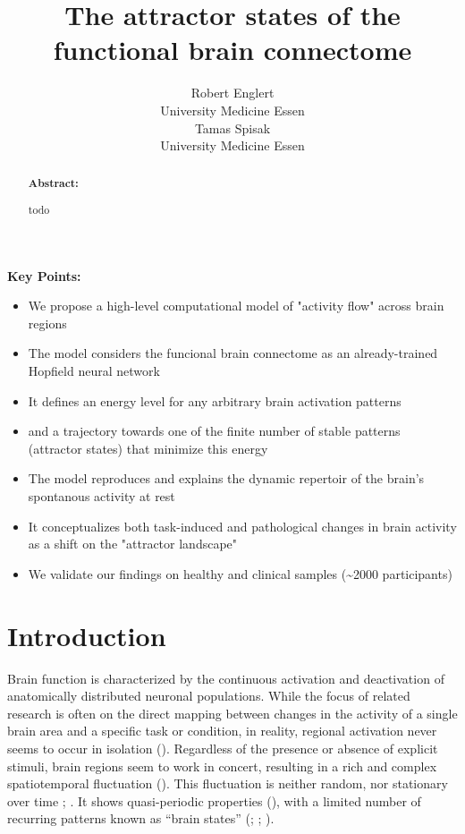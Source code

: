 \documentclass{article}
\title{The attractor states of the functional brain connectome}
\date{\displaydate{articleDate}}
\author{Robert Englert\\
University Medicine Essen\\\AND
Tamas Spisak\footnotemark[1]\\
University Medicine Essen\\}
\begin{document}
\maketitle
{}

\begin{abstract}
\textbf{Abstract:}

todo
\end{abstract}

\keywords{}

\textbf{Key Points:}

\begin{itemize}
\item We propose a high-level computational model of "activity flow" across brain regions
\item The model considers the funcional brain connectome as an already-trained Hopfield neural network
\item It defines an energy level for any arbitrary brain activation patterns
\item and a trajectory towards one of the finite number of stable patterns (attractor states) that minimize this energy
\item The model reproduces and explains the dynamic repertoir of the brain's spontanous activity at rest
\item It conceptualizes both task-induced and pathological changes in brain activity as a shift on the "attractor landscape"
\item We validate our findings on healthy and clinical samples ({\textasciitilde}2000 participants)
\end{itemize}

\section{Introduction}\label{Introduction}

Brain function is characterized by the continuous activation and deactivation of anatomically distributed neuronal populations.
While the focus of related research is often on the direct mapping between changes in the activity of a single brain area and a specific task or condition, in reality, regional activation never seems to occur in isolation (\cite{Bassett_2017}).
Regardless of the presence or absence of explicit stimuli, brain regions seem to work in concert, resulting in a rich and complex spatiotemporal fluctuation (\href{https://doi.org/10.1016/j.cub.2019.06.017}{}).
This fluctuation is neither random, nor stationary over time \cite{Liu_2013}; \href{https://doi.org/10.1073/pnas.1400181111}{}. It shows quasi-periodic properties (\href{https://doi.org/10.1016/j.neuroimage.2013.09.029}{}), with a limited number of recurring patterns known as ``brain states'' (\cite{Vidaurre_2017}; \cite{Liu_2013}; \cite{Richiardi_2011}).
\end{document}

